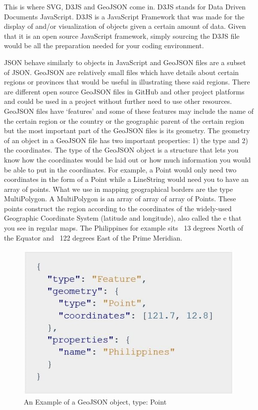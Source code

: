 \documentclass[letterpaper, 10 pt, conference]{ieeeconf}  %
\begin{document}
This is where SVG, D3JS and GeoJSON come in. D3JS stands for Data Driven Documents JavaScript. D3JS is a JavaScript Framework that was made for the display of and/or visualization of objects given a certain amount of data. Given that it is an open source JavaScript framework, simply sourcing the D3JS file would be all the preparation needed for your coding environment.\setlength{\parskip}{6pt}

JSON behave similarly to objects in JavaScript and GeoJSON files are a subset of JSON.\cite{JSONatWork} GeoJSON are relatively small files which have details about certain regions or provinces that would be useful in illustrating these said regions. There are different open source GeoJSON files in GitHub and other project platforms and could be used in a project without further need to use other resources. GeoJSON files have ‘features’ and some of these features may include the name of the certain region or the country or the geographic parent of the certain region but the most important part of the GeoJSON files is its geometry. The geometry of an object in a GeoJSON file has two important properties: 1) the type and 2) the coordinates. The type of the GeoJSON object is a structure that lets you know how the coordinates would be laid out or how much information you would be able to put in the coordinates. For example, a Point would only need two coordinates in the form of a Point while a LineString would need you to have an array of points. What we use in mapping geographical borders are the type MultiPolygon. A MultiPolygon is an array of array of array of Points. These points construct the region according to the coordinates of the widely-used Geographic Coordinate System (latitude and longitude), also called the e that you see in regular maps. The Philippines for example sits ~13 degrees North of the Equator and ~122 degrees East of the Prime Meridian. \cite{geojson} \setlength{\parskip}{6pt}


\begin{figure}[h!]
\centering
\includegraphics[scale=.6]{point.jpg}
\caption{An Example of a GeoJSON object, type: Point}
\label{fig:point}
\end{figure}
\end{document}
